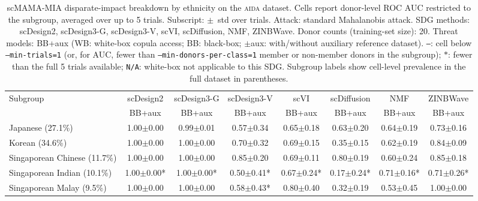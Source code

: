 \begin{table}[ht]
\centering
\small
\caption{scMAMA-MIA disparate-impact breakdown by ethnicity on the \textsc{aida} dataset. Cells report donor-level ROC AUC restricted to the subgroup, averaged over up to 5 trials. Subscript: $\pm$~std over trials. Attack: standard Mahalanobis attack. SDG methods: scDesign2, scDesign3-G, scDesign3-V, scVI, scDiffusion, NMF, ZINBWave. Donor counts (training-set size): 20. Threat models: BB+aux (WB: white-box copula access; BB: black-box; $\pm$aux: with/without auxiliary reference dataset). \texttt{---}: cell below \texttt{--min-trials=1} (or, for AUC, fewer than \texttt{--min-donors-per-class=1} member or non-member donors in the subgroup); $*$: fewer than the full 5 trials available; \texttt{N/A}: white-box not applicable to this SDG. Subgroup labels show cell-level prevalence in the full dataset in parentheses.}
\label{tab:subgroup_aida_ethnicity_sd2-sd3g-sd3v-scvi-scdiff-nmf-zinbwave_20d_100_auc}
\begin{tabular}{lccccccc}
\toprule
Subgroup & \multicolumn{1}{c|}{scDesign2} & \multicolumn{1}{c|}{scDesign3-G} & \multicolumn{1}{c|}{scDesign3-V} & \multicolumn{1}{c|}{scVI} & \multicolumn{1}{c|}{scDiffusion} & \multicolumn{1}{c|}{NMF} & \multicolumn{1}{c}{ZINBWave} \\
 & BB+aux & BB+aux & BB+aux & BB+aux & BB+aux & BB+aux & BB+aux \\
\midrule
Japanese (27.1\%) & 1.00{\scriptsize$\pm$0.00} & 0.99{\scriptsize$\pm$0.01} & 0.57{\scriptsize$\pm$0.34} & 0.65{\scriptsize$\pm$0.18} & 0.63{\scriptsize$\pm$0.20} & 0.64{\scriptsize$\pm$0.19} & 0.73{\scriptsize$\pm$0.16} \\
Korean (34.6\%) & 1.00{\scriptsize$\pm$0.00} & 1.00{\scriptsize$\pm$0.00} & 0.70{\scriptsize$\pm$0.32} & 0.69{\scriptsize$\pm$0.15} & 0.35{\scriptsize$\pm$0.15} & 0.62{\scriptsize$\pm$0.19} & 0.84{\scriptsize$\pm$0.09} \\
Singaporean Chinese (11.7\%) & 1.00{\scriptsize$\pm$0.00} & 1.00{\scriptsize$\pm$0.00} & 0.85{\scriptsize$\pm$0.20} & 0.69{\scriptsize$\pm$0.11} & 0.80{\scriptsize$\pm$0.19} & 0.60{\scriptsize$\pm$0.24} & 0.85{\scriptsize$\pm$0.18} \\
Singaporean Indian (10.1\%) & 1.00{\scriptsize$\pm$0.00}* & 1.00{\scriptsize$\pm$0.00}* & 0.50{\scriptsize$\pm$0.41}* & 0.67{\scriptsize$\pm$0.24}* & 0.17{\scriptsize$\pm$0.24}* & 0.71{\scriptsize$\pm$0.16}* & 0.71{\scriptsize$\pm$0.26}* \\
Singaporean Malay (9.5\%) & 1.00{\scriptsize$\pm$0.00} & 1.00{\scriptsize$\pm$0.00} & 0.58{\scriptsize$\pm$0.43}* & 0.80{\scriptsize$\pm$0.40} & 0.32{\scriptsize$\pm$0.19} & 0.53{\scriptsize$\pm$0.45} & 1.00{\scriptsize$\pm$0.00} \\
\bottomrule
\end{tabular}
\end{table}


